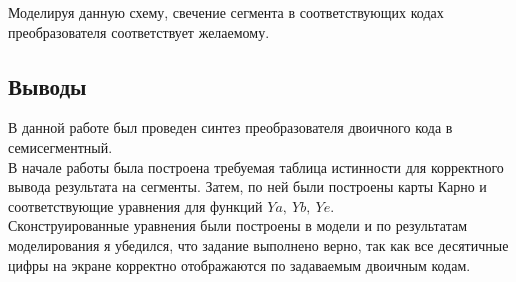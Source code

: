\documentclass[12pt]{article}
\begin{document}
Моделируя данную схему, свечение сегмента в соответствующих кодах преобразователя соответствует желаемому.

\subsection*{Выводы}
В данной работе был проведен синтез преобразователя двоичного кода в семисегментный. \\
В начале работы была построена требуемая таблица истинности для корректного вывода результата на сегменты. Затем, по ней были построены карты Карно и соответствующие уравнения для функций $Ya, \ Yb, \ Ye$. \\
Сконструированные уравнения были построены в модели и по результатам моделирования я убедился, что задание выполнено верно, так как все десятичные цифры на экране корректно отображаются по задаваемым двоичным кодам.
\end{document}
